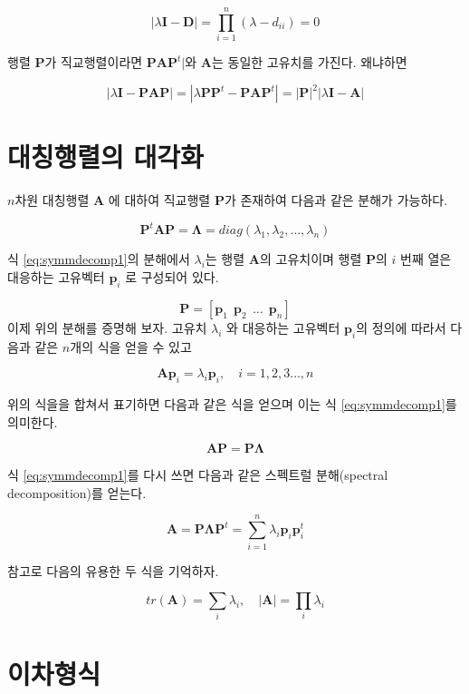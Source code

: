 \documentclass[
]{book}
\theoremstyle{definition}
\theoremstyle{definition}
\theoremstyle{definition}
\theoremstyle{remark}
\begin{document}
\[ | \lambda \bm I - \bm D | = \prod_{i=1}^n (\lambda - d_{ii}) =0 \]

행렬 \(\bm P\)가 직교행렬이라면 \(\bm P \bm A \bm P^t|\)와 \(\bm A\)는 동일한 고유치를 가진다. 왜냐하면

\[ | \lambda \bm I - \bm P \bm A \bm P | = |\lambda \bm P \bm P^t - \bm P \bm A \bm P^t| = |\bm P|^2 | \lambda \bm I - \bm A | \]

\hypertarget{uxb300uxce6duxd589uxb82cuxc758-uxb300uxac01uxd654}{%
\section{대칭행렬의 대각화}\label{uxb300uxce6duxd589uxb82cuxc758-uxb300uxac01uxd654}}

\(n\)차원 대칭행렬 \(\bm A\) 에 대하여 직교행렬 \(\bm P\)가 존재하여 다음과 같은 분해가 가능하다.

\begin{equation}
 \bm P^t \bm A \bm P = \bm \Lambda = diag(\lambda_1, \lambda_2, \dots, \lambda_n) 
 \label{eq:symmdecomp1}
\end{equation}

식 \eqref{eq:symmdecomp1}의 분해에서 \(\lambda_i\)는 행렬 \(\bm A\)의 고유치이며 행렬 \(\bm P\)의 \(i\) 번째 열은 대응하는 고유벡터 \(\bm p_i\) 로 구성되어 있다.

\[ \bm P = [ \bm p_1~~ \bm p_2 ~~ \dots ~~ \bm p_n ] \]
이제 위의 분해를 증명해 보자. 고유치 \(\lambda_i\) 와 대응하는 고유벡터 \(\bm p_i\)의 정의에 따라서 다음과 같은 \(n\)개의 식을 얻을 수 있고

\[ \bm A \bm p_i = \lambda_i \bm p_i , \quad i=1,2,3\dots, n \]

위의 식을을 합쳐서 표기하면 다음과 같은 식을 얻으며 이는 식 \eqref{eq:symmdecomp1}를 의미한다.

\[ \bm A \bm P = \bm P \bm \Lambda \]

식 \eqref{eq:symmdecomp1}를 다시 쓰면 다음과 같은 스펙트럴 분해(spectral decomposition)를 얻는다.

\begin{equation}
 \bm A  = \bm P \bm \Lambda \bm P^t  = \sum_{i=1}^n \lambda_i \bm p_i \bm {p}_i^t 
 \label{eq:spectral}
\end{equation}

참고로 다음의 유용한 두 식을 기억하자.

\[ tr(\bm A) = \sum_i \lambda_i ,\quad |\bm A| = \prod_i \lambda_i \]

\hypertarget{uxc774uxcc28uxd615uxc2dd}{%
\section{이차형식}\label{uxc774uxcc28uxd615uxc2dd}}
\end{document}
